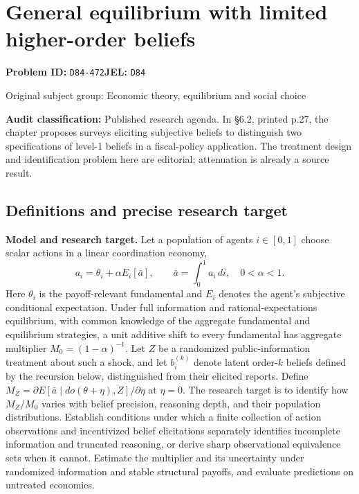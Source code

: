 \documentclass[11pt,a4paper]{article}
\begin{document}
\section*{General equilibrium with limited higher-order beliefs}
\textbf{Problem ID:} \texttt{D84-472}\quad \textbf{JEL:} \texttt{D84}\par
\label{problem:OP-0272}
{\sffamily\small\color{muted}Original subject group: Economic theory, equilibrium and social choice\par}
\label{definitions:problem:30007553}
\textbf{Audit classification:} Published research agenda. In §6.2, printed p.27, the chapter proposes surveys eliciting subjective beliefs to distinguish two specifications of level-1 beliefs in a fiscal-policy application. The treatment design and identification problem here are editorial; attenuation is already a source result.
\subsection*{Definitions and precise research target}
\textbf{Model and research target.} Let a population of agents \(i\in[0,1]\) choose scalar actions in a linear coordination economy,
\[
 a_i=\theta_i+\alpha E_i[\bar a],\qquad \bar a=\int_0^1a_i\,di,\quad0<\alpha<1.
\]
Here \(\theta_i\) is the payoff-relevant fundamental and \(E_i\) denotes the agent's subjective conditional expectation. Under full information and rational-expectations equilibrium, with common knowledge of the aggregate fundamental and equilibrium strategies, a unit additive shift to every fundamental has aggregate multiplier \(M_0=(1-\alpha)^{-1}\). Let \(Z\) be a randomized public-information treatment about such a shock, and let \(b_i^{(k)}\) denote latent order-\(k\) beliefs defined by the recursion below, distinguished from their elicited reports. Define \(M_Z=\partial E[\bar a\mid do(\theta+\eta),Z]/\partial\eta\) at \(\eta=0\). The research target is to identify how \(M_Z/M_0\) varies with belief precision, reasoning depth, and their population distributions. Establish conditions under which a finite collection of action observations and incentivized belief elicitations separately identifies incomplete information and truncated reasoning, or derive sharp observational equivalence sets when it cannot. Estimate the multiplier and its uncertainty under randomized information and stable structural payoffs, and evaluate predictions on untreated economies.
\end{document}

